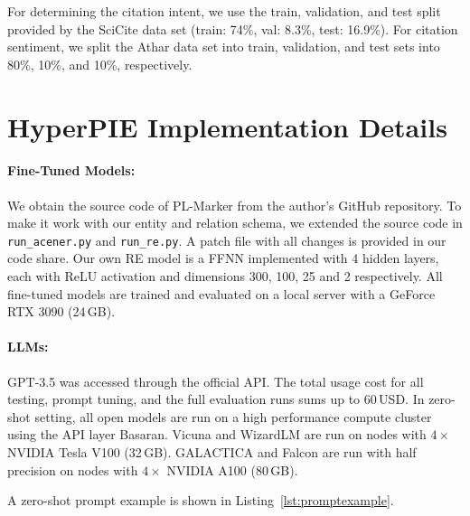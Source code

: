 For determining the citation intent, we use the train, validation, and test split provided by the SciCite data set (train: 74\%, val: 8.3\%, test: 16.9\%). For citation sentiment, we split the Athar data set into train, validation, and test sets into 80\%, 10\%, and 10\%, respectively.



\section{HyperPIE Implementation Details}\label{app:hyperpie-implementation-details}

\paragraph{Fine-Tuned Models:}
We obtain the source code of PL-Marker from the author's GitHub repository. To make it work with our entity and relation schema, we extended the source code in \texttt{run\_acener.py} and \texttt{run\_re.py}. A patch file with all changes is provided in our code share. Our own RE model is a FFNN implemented with 4 hidden layers, each with ReLU activation and dimensions 300, 100, 25 and 2 respectively. All fine-tuned models are trained and evaluated on a local server with a GeForce RTX 3090 (24\,GB).


\paragraph{LLMs:}
GPT-3.5 was accessed through the official API. The total usage cost for all testing, prompt tuning, and the full evaluation runs sums up to 60\,USD. In zero-shot setting, all open models are run on a high performance compute cluster using the API layer Basaran. Vicuna and WizardLM  are run on nodes with $4\times$ NVIDIA Tesla V100 (32\,GB). GALACTICA and Falcon are run with half precision on nodes with $4\times$ NVIDIA A100 (80\,GB).

A zero-shot prompt example is shown in Listing~\ref{lst:promptexample}.

